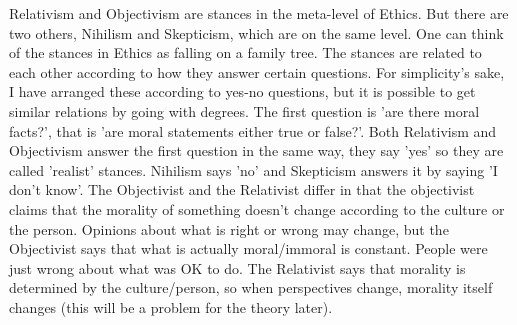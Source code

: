 Relativism and Objectivism are stances in the meta-level of Ethics. But there are two others, Nihilism and Skepticism, which are on the same level. One can think of the stances in Ethics as falling on a family tree. The stances are related to each other according to how they answer certain questions. For simplicity's sake, I have arranged these according to yes-no questions, but it is possible to get similar relations by going with degrees. The first question is 'are there moral facts?', that is 'are moral statements either true or false?'. Both Relativism and Objectivism answer the first question in the same way, they say 'yes' so they are called 'realist' stances. Nihilism says 'no' and Skepticism answers it by saying 'I don't know'. The Objectivist and the Relativist differ in that the objectivist claims that the morality of something doesn't change according to the culture or the person. Opinions about what is right or wrong may change, but the Objectivist says that what is actually moral/immoral is constant. People were just wrong about what was OK to do. The Relativist says that morality is determined by the culture/person, so when perspectives change, morality itself changes (this will be a problem for the theory later). 

\begin{center}
\end{center}


